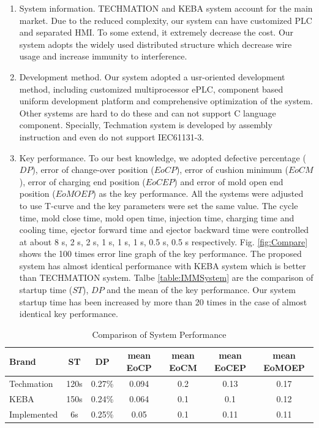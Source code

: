 \documentclass[journal,UTF8]{IEEEtran}
\begin{document}
\begin{enumerate}
	\item System information. TECHMATION and KEBA system account for the main market. Due to the reduced complexity, our system can have customized PLC and separated HMI. To some extend, it extremely decrease the cost. Our system adopts the widely used distributed structure which decrease wire usage and increase immunity to interference.
	\item Development method. Our system adopted a usr-oriented development method, including customized multiprocessor ePLC, component based uniform development platform and comprehensive optimization of the system. Other systems are hard to do these and can not support C language component. Specially, Techmation system is developed by assembly instruction and even do not support IEC61131-3.
	\item Key performance. To our best knowledge, we adopted defective percentage ($DP$), error of change-over position ($EoCP$), error of cushion minimum ($EoCM$), error of charging end position ($EoCEP$) and error of mold open end position ($EoMOEP$) as the key performance. All the systems were adjusted to use T-curve and the key parameters were set the same value. The cycle time, mold close time, mold open time, injection time, charging time and cooling time, ejector forward time and ejector backward time were controlled at about 8 s, 2 s, 2 s, 1 s, 1 s, 1 s, 0.5 s, 0.5 s respectively. Fig. \ref{fig:Compare} shows the 100 times error line graph of the key performance. The proposed system has almost identical performance with KEBA system which is better than TECHMATION system. Talbe \ref{table:IMMSystem} are the comparison of startup time ($ST$), $DP$ and the mean of the key performance. Our system startup time has been increased by more than 20 times in the case of almost identical key performance.
\end{enumerate}
\begin{table}
	\scriptsize \caption{Comparison of System Performance}
	\label{table:ComparisonG}
	\begin{center}
		\renewcommand{\arraystretch}{1.4}
		\setlength\tabcolsep{3pt}
		\begin{tabular}{|l|c|c|c|c|c|c|}
			\hline
			Brand & ST &DP&mean EoCP&mean EoCM&mean EoCEP&mean EoMOEP\\
			\hline
			Techmation  & 120s  &0.27\% &0.094 & 0.2 & 0.13 & 0.17 \\
			\hline
			KEBA        & 150s  &0.24\% &0.064 & 0.1 & 0.1 & 0.12 \\
			\hline
			Implemented   & 6s     &0.25\% &0.05 & 0.1 & 0.11 & 0.11\\
			\hline
		\end{tabular}
	\end{center}
\end{table}
\end{document}
